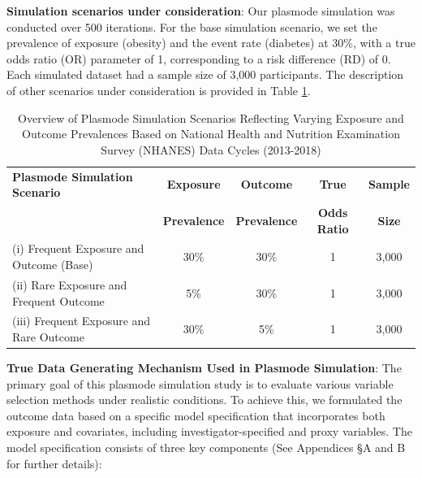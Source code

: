 \documentclass[sn-vancouver,Numbered,lineno,pdflatex]{sn-jnl}
\begin{document}
\textbf{Simulation scenarios under consideration}: Our plasmode
simulation was conducted over 500 iterations. For the base simulation
scenario, we set the prevalence of exposure (obesity) and the event rate
(diabetes) at 30\%, with a true odds ratio (OR) parameter of 1,
corresponding to a risk difference (RD) of 0. Each simulated dataset had
a sample size of 3,000 participants. The description of other scenarios
under consideration is provided in Table \ref{table:scenarios}.

\begin{table}[ht]
\centering
\caption{Overview of Plasmode Simulation Scenarios Reflecting Varying Exposure and Outcome Prevalences Based on National Health and Nutrition Examination Survey (NHANES) Data Cycles (2013-2018)}
\label{table:scenarios}
\begin{tabular}{lcccc}
  \toprule
  \textbf{Plasmode Simulation Scenario} & \textbf{Exposure} & \textbf{Outcome} & \textbf{True} & \textbf{Sample}\\
  \textbf{} & \textbf{Prevalence} & \textbf{Prevalence} & \textbf{Odds Ratio} & \textbf{Size}\\
  \midrule
  (i) Frequent Exposure and Outcome (Base) & 30\% & 30\% & 1 & 3,000 \\
  (ii) Rare Exposure and Frequent Outcome & 5\% & 30\% & 1 & 3,000 \\
  (iii) Frequent Exposure and Rare Outcome & 30\% & 5\% & 1 & 3,000 \\
  \bottomrule
\end{tabular}
\end{table}

\textbf{True Data Generating Mechanism Used in Plasmode Simulation}: The
primary goal of this plasmode simulation study is to evaluate various
variable selection methods under realistic conditions. To achieve this,
we formulated the outcome data based on a specific model specification
that incorporates both exposure and covariates, including
investigator-specified and proxy variables. The model specification
consists of three key components (See Appendices \S A and B for further
details):
\end{document}
